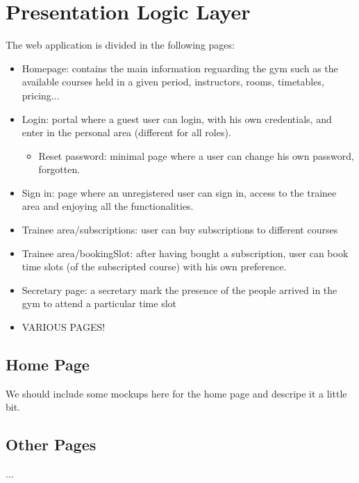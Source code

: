 \section{Presentation Logic Layer}


The web application is divided in the following pages:
\begin{itemize}
	\item Homepage: contains the main information reguarding the gym such as the available courses held in a given period, instructors, rooms, timetables, pricing...
	\item Login: portal where a guest user can login, with his own credentials, and enter in the personal area (different for all roles).
	\begin{itemize}
		\item Reset password: minimal page where a user can change his own password, forgotten.
	\end{itemize}
	\item Sign in: page where an unregistered user can sign in, access to the trainee area and enjoying all the functionalities.
	\item Trainee area/subscriptions: user can buy subscriptions to different courses
	\item Trainee area/bookingSlot: after having bought a subscription, user can book time slots (of the subscripted course) with his own preference.
	\item Secretary page: a secretary mark the presence of the people arrived in the gym to attend a particular time slot
	
	\item VARIOUS PAGES!
\end{itemize}

\subsection{Home Page}

We should include some mockups here for the home page and descripe it a little bit.


\subsection{Other Pages}
...